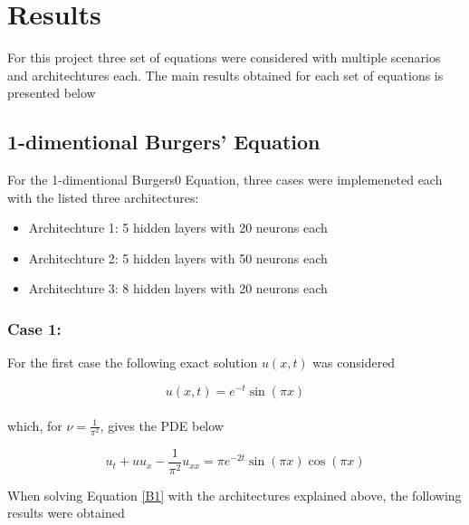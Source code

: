 \documentclass[12pt,letterpaper]{article}
\begin{document}
\section{Results}

For this project three set of equations were considered with multiple scenarios and architechtures each. The main results obtained for each set of equations is presented below

\subsection{1-dimentional Burgers' Equation}

For the 1-dimentional Burgers0 Equation, three cases were implemeneted each with the listed three architectures:

\begin{itemize}
  \item Architechture 1: 5 hidden layers with 20 neurons each
  \item Architechture 2: 5 hidden layers with 50 neurons each
  \item Architechture 3: 8 hidden layers with 20 neurons each
\end{itemize}

\subsubsection*{Case 1:}

For the first case the following exact solution $u(x,t)$ was considered

$$u(x,t) = e^{-t}\sin(\pi x)$$\\

which, for $\nu=\frac{1}{\pi^2}$, gives the PDE below

\begin{equation}
  \label{B1}
  u_t + u u_x - \frac{1}{\pi^2}u_{xx} = \pi e^{-2t}\sin(\pi x)\cos(\pi x) 
\end{equation}

When solving Equation \ref{B1} with the architectures explained above, the following results were obtained
\end{document}
